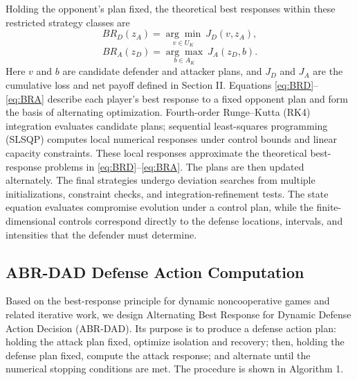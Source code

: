 \documentclass[conference,letterpaper]{IEEEtran}
\begin{document}
Holding the opponent's plan fixed, the theoretical best responses within these restricted strategy classes are
\begin{equation}\label{eq:BRD}
BR_D(z_A)=\underset{v\in U_K}{\arg\min}\ J_D(v,z_A),
\end{equation}
\begin{equation}\label{eq:BRA}
BR_A(z_D)=\underset{b\in A_K}{\arg\max}\ J_A(z_D,b).
\end{equation}
Here $v$ and $b$ are candidate defender and attacker plans, and $J_D$ and $J_A$ are the cumulative loss and net payoff defined in Section II. Equations \eqref{eq:BRD}--\eqref{eq:BRA} describe each player's best response to a fixed opponent plan and form the basis of alternating optimization. Fourth-order Runge--Kutta (RK4) integration\cite{r19} evaluates candidate plans; sequential least-squares programming (SLSQP) computes local numerical responses under control bounds and linear capacity constraints\cite{r20,r21}. These local responses approximate the theoretical best-response problems in \eqref{eq:BRD}--\eqref{eq:BRA}. The plans are then updated alternately. The final strategies undergo deviation searches from multiple initializations, constraint checks, and integration-refinement tests. The state equation evaluates compromise evolution under a control plan, while the finite-dimensional controls correspond directly to the defense locations, intervals, and intensities that the defender must determine.

\subsection{ABR-DAD Defense Action Computation}
Based on the best-response principle for dynamic noncooperative games\cite{r17} and related iterative work\cite{r22}, we design Alternating Best Response for Dynamic Defense Action Decision (ABR-DAD). Its purpose is to produce a defense action plan: holding the attack plan fixed, optimize isolation and recovery; then, holding the defense plan fixed, compute the attack response; and alternate until the numerical stopping conditions are met. The procedure is shown in Algorithm 1.
\end{document}
